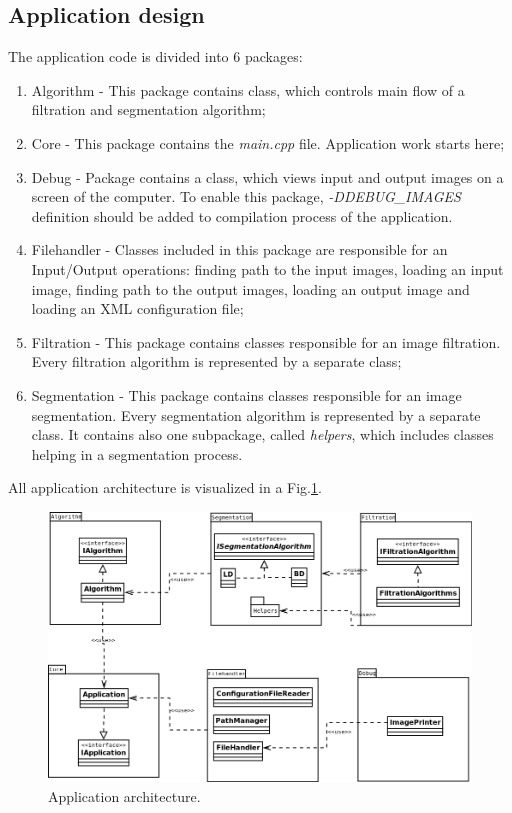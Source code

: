 \documentclass[a4paper,onecolumn,oneside,12pt]{memoir}
\begin{document}
\subsection{Application design}

The application code is divided into 6 packages:

\begin{enumerate}
  \item Algorithm - This package contains class, which controls main flow of a filtration and
        segmentation algorithm;
  \item Core - This package contains the \textit{main.cpp} file. Application work starts here;
  \item Debug - Package contains a class, which views input and output images on a screen of the
        computer. To enable this package, \textit{-DDEBUG\_IMAGES} definition should be added to
        compilation process of the application.
  \item Filehandler - Classes included in this package are responsible for an Input/Output
        operations: finding path to the input images, loading an input image, finding path to the
        output images, loading an output image and loading an XML configuration file;
  \item Filtration - This package contains classes responsible for an image filtration. Every
        filtration algorithm is represented by a separate class;
  \item Segmentation - This package contains classes responsible for an image segmentation. Every
        segmentation algorithm is represented by a separate class. It contains also one subpackage,
        called \textit{helpers}, which includes classes helping in a segmentation process.
\end{enumerate}

All application architecture is visualized in a Fig.\ref{classDiagramImage}.

\begin{figure}[!ht]
\begin{center}
\includegraphics[scale=0.4]{images/classDiagram.png}
\caption{Application architecture.}
\label{classDiagramImage}
\end{center}
\end{figure}
\end{document}
